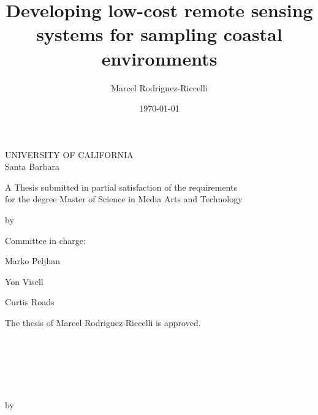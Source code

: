 \documentclass{article}
\title{Developing low-cost remote sensing systems for sampling coastal environments}
\author{Marcel Rodriguez-Riccelli}
\date{\today}
\begin{document}
\begin{center}
\thispagestyle{empty}
\par{UNIVERSITY OF CALIFORNIA \\[.5cm] Santa Barbara} 
\vspace{1.25cm}
\par{\huge \thetitle}
\vspace{1.5cm}
\par{A Thesis submitted in partial satisfaction of the requirements \\ for the degree Master of Science in Media Arts and Technology}
\vspace{1cm}
{by \par}
\vspace{1cm}
{\theauthor}
\vspace{1.5cm}
\par{Committee in charge:}
\vspace{1cm}
\par{Marko Peljhan}
\vspace{1cm}
\par{Yon Visell}
\vspace{1cm}
\par{Curtis Roads}
\vspace{2cm}
\par{\thedate}
\end{center}

\newpage
\thispagestyle{empty}
\begin{center}
\par{The thesis of Marcel Rodriguez-Riccelli is approved.}
\vspace{2cm}
\par{\makebox[10cm][l]{\rule{10cm}{0.4pt}}\\
}
\vspace{1cm}
\par{\makebox[10cm][l]{\rule{10cm}{0.4pt}}\\
}
\vspace{1cm}
\par{\makebox[10cm][l]{\rule{10cm}{0.4pt}}\\
}
\vspace{2cm}
\par{\thedate}
\end{center}

\newpage
{}
\thispagestyle{fancy}
\begin{center}
\par{\thetitle}
\vspace{.5cm}
{by \par}
\vspace{.5cm}
\par{\theauthor}
\vspace{.5cm}
\end{center}
\doublespacing
\end{document}
